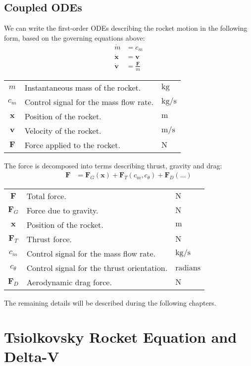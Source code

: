 \documentclass[12pt,openany]{book}
\renewcommand{\vec}[1]{\ensuremath{\mathbf{#1}}}
\newcommand{\vecdot}[1]{\ensuremath{\dot{\mathbf{#1}}}}
\newenvironment{symbols}
{%
  \begin{flushright}%
  \begin{tcolorbox}[enhanced,width=0.9\textwidth,colback=black!8!white,frame hidden]%
  \begin{tabular}{cp{0.8\textwidth}l}%
}
{%
  \end{tabular}%
  \end{tcolorbox}%
  \end{flushright}%
}
\newcommand{\unitsforce}{$\mathrm{N}$}
\newcommand{\unitsmass}{$\mathrm{kg}$}
\newcommand{\unitsmassflowrate}{$\mathrm{kg}/\mathrm{s}$}
\newcommand{\unitslength}{$\mathrm{m}$}
\newcommand{\unitsvelocity}{$\mathrm{m}/\mathrm{s}$}
\newcommand{\unitsradians}{$\mathrm{radians}$}
\begin{document}
\section{Coupled ODEs}

We can write the first-order ODEs describing the rocket motion in the following form, based on the governing equations above:
\begin{align}
  \dot{m} &= c_{\dot{m}} \\
  \vecdot{x} &= \vec{v} \\
  \vecdot{v} &= \frac{\vec{F}}{m}
\end{align}
\begin{symbols}
  $m$ & Instantaneous mass of the rocket. & \unitsmass \\
  $c_{\dot{m}}$ & Control signal for the mass flow rate. & \unitsmassflowrate \\
  $\vec{x}$ & Position of the rocket. & \unitslength \\
  $\vec{v}$ & Velocity of the rocket. & \unitsvelocity \\ 
  $\vec{F}$ & Force applied to the rocket. & \unitsforce \\
\end{symbols}
The force is decomposed into terms describing thrust, gravity and drag:
\begin{align}
  \vec{F} &= \vec{F}_G(\vec{x})
  + \vec{F}_T(c_{\dot{m}}, c_{\theta})
  + \vec{F}_D(\ldots)
\end{align}
\begin{symbols}
  \vec{F} & Total force. & \unitsforce \\
  $\vec{F}_G$ & Force due to gravity. & \unitsforce \\
  $\vec{x}$ & Position of the rocket. & \unitslength \\
  $\vec{F}_T$ & Thrust force. & \unitsforce \\
  $c_{\dot{m}}$ & Control signal for the mass flow rate. & \unitsmassflowrate \\
  $c_{\theta}$ & Control signal for the thrust orientation. & \unitsradians \\
  $\vec{F}_D$ & Aerodynamic drag force. & \unitsforce \\
\end{symbols}
The remaining details will be described during the following chapters.

\chapter{Tsiolkovsky Rocket Equation and Delta-V}





\end{document}
